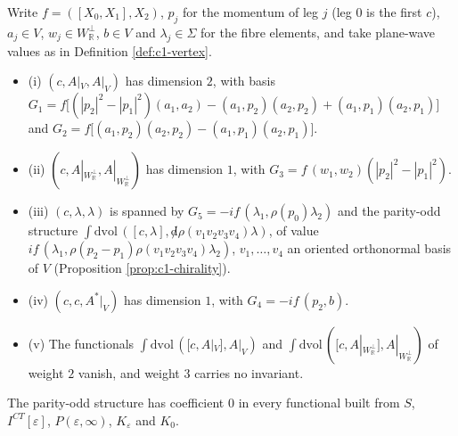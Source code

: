 \begin{proposition}
\label{prop:c9-basis}
Write $f=([X_0,X_1],X_2)$, $p_j$ for the momentum of leg $j$ (leg $0$ is the first $c$), $a_j\in V$, $w_j\in W_{\mathbb R}^\perp$, $b\in V$ and $\lambda_j\in\Sigma$ for the fibre elements, and take plane-wave values as in Definition \ref{def:c1-vertex}.
\begin{itemize}
\item (i) $(c,A|_V,A|_V)$ has dimension $2$, with basis $G_1=f\big[(|p_2|^2-|p_1|^2)(a_1,a_2)-(a_1,p_2)(a_2,p_2)+(a_1,p_1)(a_2,p_1)\big]$ and $G_2=f\big[(a_1,p_2)(a_2,p_2)-(a_1,p_1)(a_2,p_1)\big]$.
\item (ii) $(c,A|_{W_{\mathbb R}^\perp},A|_{W_{\mathbb R}^\perp})$ has dimension $1$, with $G_3=f\,(w_1,w_2)(|p_2|^2-|p_1|^2)$.
\item (iii) $(c,\lambda,\lambda)$ is spanned by $G_5=-if\,(\lambda_1,\rho(p_0)\lambda_2)$ and the parity-odd structure $\int\mathrm{dvol}\,([c,\lambda],{\not d}\rho(v_1v_2v_3v_4)\lambda)$, of value $if\,(\lambda_1,\rho(p_2-p_1)\rho(v_1v_2v_3v_4)\lambda_2)$, $v_1,\dots,v_4$ an oriented orthonormal basis of $V$ (Proposition \ref{prop:c1-chirality}).
\item (iv) $(c,c,A^*|_V)$ has dimension $1$, with $G_4=-if\,(p_2,b)$.
\item (v) The functionals $\int\mathrm{dvol}\,([c,A|_V],A|_V)$ and $\int\mathrm{dvol}\,([c,A|_{W_{\mathbb R}^\perp}],A|_{W_{\mathbb R}^\perp})$ of weight $2$ vanish, and weight $3$ carries no invariant.
\end{itemize}
The parity-odd structure has coefficient $0$ in every functional built from $S$, $I^{CT}[\varepsilon]$, $P(\varepsilon,\infty)$, $K_\varepsilon$ and $K_0$.
\end{proposition}

